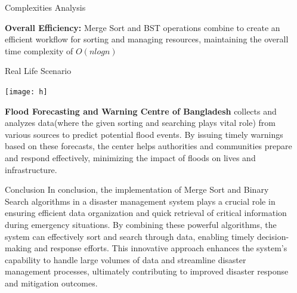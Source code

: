 \documentclass[final]{beamer}
\newlength{\sepwidth}
\newlength{\colwidth}
\newcommand{\separatorcolumn}{\begin{column}{\sepwidth}\end{column}}
\begin{document}
\begin{frame}[t]
\begin{columns}[t]
\begin{column}{\colwidth}
\begin{block}{Complexities Analysis}
                
                
            
\textbf{Overall Efficiency:} Merge Sort and BST operations combine to create an efficient workflow for sorting and managing resources, maintaining the overall time complexity of $O(nlogn)$
                \end{block}
       
                \begin{block}{Real Life Scenario}
                \centerline{\texttt{[image: h]}}
                \justifying 
                \textbf{Flood Forecasting and Warning Centre of Bangladesh }collects and analyzes data(where the given sorting and searching plays vital role) from various sources to predict potential flood events. By issuing timely warnings based on these forecasts, the center helps authorities and communities prepare and respond effectively, minimizing the impact of floods on lives and infrastructure.
     
    		\end{block}
      
                \begin{block}{Conclusion}
        			\justifying
                  In conclusion, the implementation of Merge Sort and Binary Search algorithms in a disaster management system plays a crucial role in ensuring efficient data organization and quick retrieval of critical information during emergency situations. By combining these powerful algorithms, the system can effectively sort and search through data, enabling timely decision-making and response efforts. This innovative approach enhances the system's capability to handle large volumes of data and streamline disaster management processes, ultimately contributing to improved disaster response and mitigation outcomes.
    			\end{block}
               
                
    		\end{column}
    		\separatorcolumn
    	\end{columns}  
    \end{frame}
\end{document}
